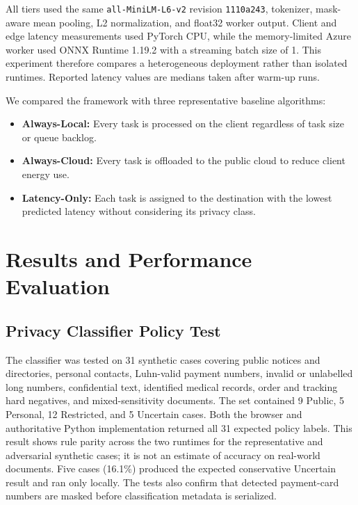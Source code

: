 \documentclass[conference]{IEEEtran}
\begin{document}
All tiers used the same \texttt{all-MiniLM-L6-v2} revision \texttt{1110a243}, tokenizer, mask-aware mean pooling, L2 normalization, and float32 worker output. Client and edge latency measurements used PyTorch CPU, while the memory-limited Azure worker used ONNX Runtime 1.19.2 with a streaming batch size of 1. This experiment therefore compares a heterogeneous deployment rather than isolated runtimes. Reported latency values are medians taken after warm-up runs.

We compared the framework with three representative baseline algorithms:
\begin{itemize}
  \item \textbf{Always-Local:} Every task is processed on the client regardless of task size or queue backlog.
  \item \textbf{Always-Cloud:} Every task is offloaded to the public cloud to reduce client energy use.
  \item \textbf{Latency-Only:} Each task is assigned to the destination with the lowest predicted latency without considering its privacy class.
\end{itemize}

\section{Results and Performance Evaluation}

\subsection{Privacy Classifier Policy Test}
The classifier was tested on 31 synthetic cases covering public notices and directories, personal contacts, Luhn-valid payment numbers, invalid or unlabelled long numbers, confidential text, identified medical records, order and tracking hard negatives, and mixed-sensitivity documents. The set contained 9 Public, 5 Personal, 12 Restricted, and 5 Uncertain cases.
Both the browser and authoritative Python implementation returned all 31 expected policy labels. This result shows rule parity across the two runtimes for the representative and adversarial synthetic cases; it is not an estimate of accuracy on real-world documents.
Five cases (16.1\%) produced the expected conservative Uncertain result and ran only locally. The tests also confirm that detected payment-card numbers are masked before classification metadata is serialized.
\end{document}
